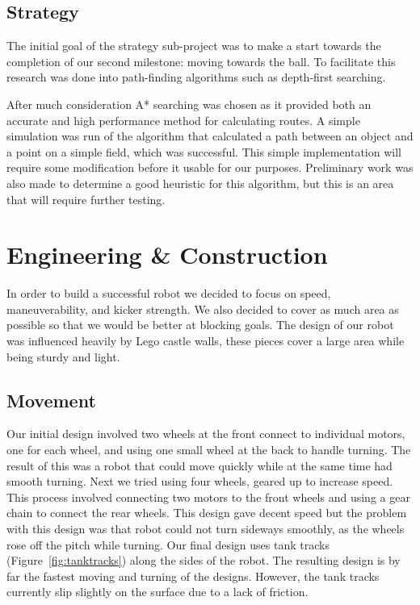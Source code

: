 \documentclass[12pt, a4paper, titlepage]{article}
\begin{document}
\subsection{Strategy}

The initial goal of the strategy sub-project was to make a start towards the
completion of our second milestone: moving towards the ball. To facilitate this
research was done into path-finding algorithms such as depth-first searching.

After much consideration A* searching was chosen as it provided both an accurate
and high performance method for calculating routes. A simple simulation was
run of the algorithm that calculated a path between an object and a point on a
simple field, which was successful. This simple implementation will require some
modification before it usable for our purposes. Preliminary work was also made
to determine a good heuristic for this algorithm, but this is an area that will
require further testing.

\section{Engineering \& Construction}

In order to build a successful robot we decided to focus on speed,
maneuverability, and kicker strength. We also decided to cover as much area as
possible so that we would be better at blocking goals. The design of our robot
was influenced heavily by Lego castle walls, these pieces cover a large area
while being sturdy and light.

\subsection{Movement}

Our initial design involved two wheels at the front connect to individual
motors, one for each wheel, and using one small wheel at the back to handle
turning. The result of this was a robot that could move quickly while at the
same time had smooth turning. Next we tried using four wheels, geared up to
increase speed. This process involved connecting two motors to the front wheels
and using a gear chain to connect the rear wheels. This design gave decent
speed but the problem with this design was that robot could not turn sideways
smoothly, as the wheels rose off the pitch while turning. Our final design
uses tank tracks (Figure~\ref{fig:tanktracks}) along the sides of the robot.
The resulting design is by far the fastest moving and turning of the designs.
However, the tank tracks currently slip slightly on the surface due to a lack of
friction.
\end{document}
